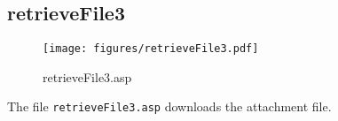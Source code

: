 \subsection{retrieveFile3}
\begin{figure}[htb]
    \begin{center}
        \texttt{[image: figures/retrieveFile3.pdf]}
    \end{center}
    \caption{retrieveFile3.asp}
    \label{fig:retrieveFile3}
\end{figure}

The file \verb|retrieveFile3.asp| downloads the attachment file.
